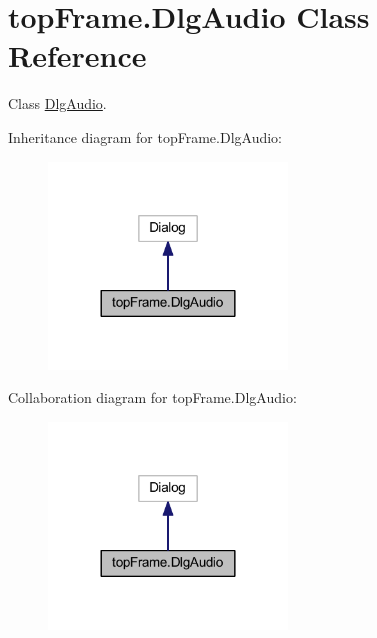 \hypertarget{classtop_frame_1_1_dlg_audio}{\section{top\-Frame.\-Dlg\-Audio Class Reference}
\label{classtop_frame_1_1_dlg_audio}
}


Class \hyperlink{classtop_frame_1_1_dlg_audio}{Dlg\-Audio}.  




Inheritance diagram for top\-Frame.\-Dlg\-Audio\-:
\nopagebreak
\begin{figure}[H]
\begin{center}
\leavevmode
\includegraphics[width=180pt]{classtop_frame_1_1_dlg_audio__inherit__graph}
\end{center}
\end{figure}


Collaboration diagram for top\-Frame.\-Dlg\-Audio\-:
\nopagebreak
\begin{figure}[H]
\begin{center}
\leavevmode
\includegraphics[width=180pt]{classtop_frame_1_1_dlg_audio__coll__graph}
\end{center}
\end{figure}
